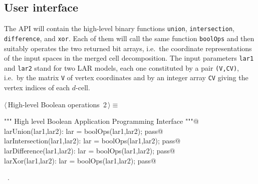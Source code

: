 \documentclass[11pt,oneside]{article}	%
\begin{document}
\subsection{User interface}

The API will contain the high-level binary functions \texttt{union}, \texttt{intersection}, \texttt{difference}, and \texttt{xor}. Each of them will call the same function \texttt{boolOps} and then suitably operates the two returned bit arrays, i.e.~the coordinate representations of the input spaces in the merged cell decomposition. The input parameters \texttt{lar1} and  \texttt{lar2} stand for two LAR models, each one constituted by a pair \texttt{(V,CV)}, i.e.~by the matrix \texttt{V} of vertex coordinates and by an integer array \texttt{CV} giving the vertex indices of each $d$-cell.

\begin{flushleft} \small \label{scrap1}
\protect{}$\langle\,$High-level Boolean operations\nobreak\ {\footnotesize 2}$\,\rangle\equiv$
\vspace{-1ex}
\begin{list}{}{} \item
\mbox{}\verb@""" High level Boolean Application Programming Interface """@\\
\mbox{}\verb@def larUnion(lar1,lar2): lar = boolOps(lar1,lar2); pass@\\
\mbox{}\verb@def larIntersection(lar1,lar2): lar = boolOps(lar1,lar2); pass@\\
\mbox{}\verb@def larDifference(lar1,lar2): lar = boolOps(lar1,lar2); pass@\\
\mbox{}\verb@def larXor(lar1,lar2): lar = boolOps(lar1,lar2); pass@\\
\mbox{}\verb@@{\NWsep}
\end{list}
\vspace{-1ex}
\footnotesize\addtolength{\baselineskip}{-1ex}
\begin{list}{}{\setlength{\itemsep}{-\parsep}\setlength{\itemindent}{-\leftmargin}}
\item \NWtxtMacroRefIn\ .
\end{list}
\end{flushleft}


\end{document}

